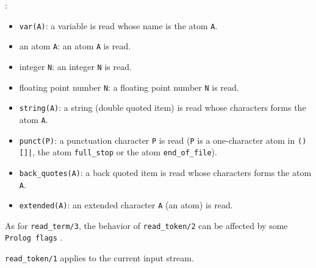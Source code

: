 :

\begin{itemize}

\item {}\texttt{var(A)}: a variable is read whose name is the atom
\texttt{A}.

\item an atom \texttt{A}: an atom \texttt{A} is read.

\item integer \texttt{N}: an integer \texttt{N} is read.

\item floating point number \texttt{N}: a floating point number \texttt{N}
is read.

\item {}\texttt{string(A)}: a string (double quoted item) is read whose
characters forms the atom \texttt{A}.

\item {}\texttt{punct(P)}: a punctuation character \texttt{P} is read
(\texttt{P} is a one-character atom in \texttt{()[]{\lb}|{\rb}}, the atom
\texttt{full\_stop} or the atom \texttt{end\_of\_file}).

\item {}\texttt{back\_quotes(A)}: a back quoted item is read
whose characters forms the atom \texttt{A}.

\item {}\texttt{extended(A)}: an extended character \texttt{A} (an
atom) is read.

\end{itemize}

As for \texttt{read\_term/3}, the behavior of \texttt{read\_token/2} can be
affected by some \texttt{Prolog flags} .

\texttt{read\_token/1} applies to the current input stream.

\begin{PlErrors}








\end{PlErrors}

